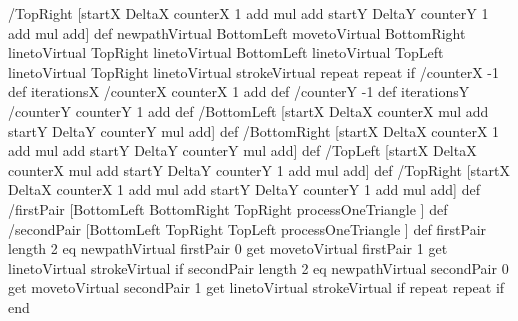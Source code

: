 {{{{{{{/TopRight [startX DeltaX counterX 1 add mul add startY DeltaY counterY 1 add mul add] def
newpathVirtual
BottomLeft \fcCoordsPStricksToPS  movetoVirtual
BottomRight \fcCoordsPStricksToPS linetoVirtual
TopRight \fcCoordsPStricksToPS linetoVirtual
BottomLeft \fcCoordsPStricksToPS linetoVirtual
TopLeft \fcCoordsPStricksToPS linetoVirtual
TopRight \fcCoordsPStricksToPS linetoVirtual
strokeVirtual
}repeat
}repeat
}if
\fcLineFormatCodeVirtual
/counterX -1 def
iterationsX {
/counterX counterX 1 add def
/counterY -1 def
iterationsY {
/counterY counterY 1 add def
%
/BottomLeft [startX DeltaX counterX mul add startY DeltaY counterY mul add] def
/BottomRight [startX DeltaX counterX 1 add mul add startY DeltaY counterY mul add] def
/TopLeft [startX DeltaX counterX mul add startY DeltaY counterY 1 add mul add] def
/TopRight [startX DeltaX counterX 1 add mul add startY DeltaY counterY 1 add mul add] def
/firstPair  [BottomLeft BottomRight TopRight processOneTriangle ] def
/secondPair [BottomLeft TopRight    TopLeft  processOneTriangle ] def
firstPair length 2 eq
{newpathVirtual
firstPair 0 get \fcCoordsPStricksToPS movetoVirtual
firstPair 1 get \fcCoordsPStricksToPS linetoVirtual
strokeVirtual
}if
secondPair length 2 eq
{newpathVirtual
secondPair 0 get \fcCoordsPStricksToPS movetoVirtual
secondPair 1 get \fcCoordsPStricksToPS linetoVirtual
strokeVirtual
}if
}repeat
}repeat
}if
end
}}%
}%

\newcommand{\fcGrid}[8][]{%
\setkeys{fcGraphics}{#1}%
\pscustom{%
\code{%
20 dict begin
/startX #2\space def
/startY #3\space def
/iterationsX #4\space def
/iterationsY #5\space def
/DeltaX #6\space def
/DeltaY #7\space def
/stickyPiece (#8) () eq (#8) ( ) eq or {0}{#8}ifelse def
\fcLineFormatCode
/counterX -1 def
iterationsX 1 add{
/counterX counterX 1 add def
/currentX1 counterX DeltaX mul startX add def
/currentY1 0        stickyPiece sub DeltaY mul startY add def
/currentY2 iterationsY stickyPiece add DeltaY mul startY add def
/currentX2 currentX1 def
newpath
[currentX1 currentY1] \fcCoordsPStricksToPS moveto
[currentX2 currentY2] \fcCoordsPStricksToPS lineto
stroke
} repeat
/counterY -1 def
iterationsY 1 add{
/counterY counterY 1 add def
/currentX1 0        stickyPiece sub DeltaX mul startX add def
/currentY1 counterY DeltaY mul startY add def
/currentY2 currentY1 def
/currentX2 iterationsX stickyPiece add DeltaX mul startX add def
newpath
[currentX1 currentY1] \fcCoordsPStricksToPS moveto
[currentX2 currentY2] \fcCoordsPStricksToPS lineto
stroke
} repeat
end
}%
}%
}


